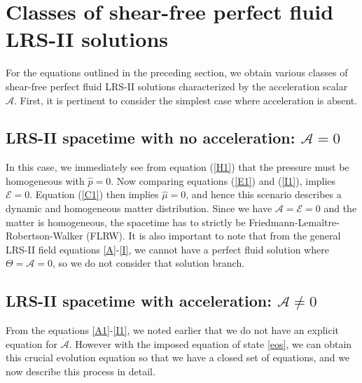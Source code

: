 \documentclass[abstract=on,notitlepage,superscriptaddress,nofootinbib,aps,showpacs,twocolumn,prd]{revtex4}
\newcommand{\0}{^{(0)}}
\newcommand{\1}{^{(1)}}
\newcommand{\2}{^{(2)}}
\newcommand{\3}{{}^{(3)}}
\begin{document}

\section{Classes of shear-free perfect fluid LRS-II  solutions}
For the equations outlined in the preceding section, we obtain various classes of shear-free perfect fluid LRS-II solutions characterized by the acceleration scalar $\mathcal{A}$. First, it is pertinent to consider the simplest case where acceleration is absent.



\subsection{LRS-II spacetime with no acceleration: $\mathcal{A} = 0$}\label{no_accn}

In this case, we immediately see from equation (\ref{H1}) that the pressure must be homogeneous with $\hat{p}=0$. Now comparing equations (\ref{E1}) and (\ref{I1}), implies $  \mathcal{E}=0$.
Equation (\ref{C1}) then implies $\hat{\mu}=0$, and hence this scenario describes a dynamic and homogeneous matter distribution.
Since we have $\mathcal{A} = \mathcal{E} = 0$ and the matter is homogeneous, the spacetime has to strictly be Friedmann-Lema\^itre-Robertson-Walker (FLRW). It is also important to note that from the general LRS-II field equations \eqref{A}-\eqref{I}, we cannot have a perfect fluid solution where $\Theta = \mathcal{A}=0$, so we do not consider that solution branch. 


 


\subsection{LRS-II spacetime with acceleration: $\mathcal{A} \neq 0$}
From the equations \eqref{A1}-\eqref{I1}, we noted earlier that we do not have an explicit equation for  $\dot{\mathcal{A}}$. However with the imposed equation of state \eqref{eos}, we can obtain this crucial evolution equation so that we have a closed set of equations, and we now describe this process in detail. 
\end{document}

